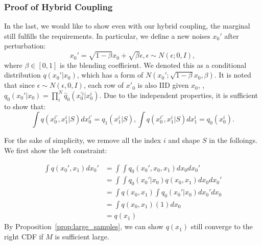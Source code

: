 \subsubsection{Proof of Hybrid Coupling}

In the last, we would like to show even with our hybrid coupling, the marginal still fulfills the requirements.
%
In particular, we define a new noises $x_0'$ after perturbation:
\begin{equation}
    x_0' = \sqrt{1 - \beta} x_0 + \sqrt{\beta} \epsilon, \epsilon \sim N(\epsilon; 0, I),
\end{equation}
where $\beta \in [0, 1]$ is the blending coefficient. We denoted this as a conditional distribution $q(x_0'| x_0)$, which has a form of $N(x_0'; \sqrt{1 - \beta}x_0, \beta)$.
%
It is noted that since $\epsilon \sim N(\epsilon, 0, I)$, each row of $x'_0$ is also IID given $x_0$, \ie, $q_0(x_0' | x_0) = \prod_i^N \hat{q}_0(x_0^{'i} | x_0^i)$.
%
Due to the independent properties, it is sufficient to show that:
\begin{equation}
    \int q(x_0^{i'}, x_1^i | S) dx_0^{i'} = q_1(x^i_1|S), 
    \int q(x_0^{i'}, x_1^i | S) dx_1^{i} = q_0(x_0^i).
\end{equation}

For the sake of simplicity, we remove all the index $i$ and shape $S$ in the folloings.
We first show the left constraint:
\iffalse
\begin{align}
    q(x_1) & = \int q(x_0', x_1) dx_0' = \int \int q_0(x_0) q(x_0'| x_0) q(x_1|x_0, x_0') dx_0 dx_0' \\
    & = \int \int q_0(x_0) q(x_0'| x_0) q(x_1|x_0) dx_0 dx_0' \\
    & =  \int \int  q_0(x_0) q(x_0'| x_0) q(x_1|x_0)  dx_0' dx_0 \\
    & = \int q_0(x_0) q(x_1|x_0) \int  q(x_0'| x_0)  dx_0' dx_0 \\
    & = \int q_0(x_0) q(x_1|x_0) (1) dx_0 \\
    & = \int q(x_0, x_1) dx_0  = \frac{1}{M} \\
\end{align}
\fi
\begin{align}
    \int q(x_0', x_1) dx_0' & = \int \int q_0(x_0', x_0, x_1) dx_0 dx_0' \\
    & = \int \int q_0(x_0'|x_0) q(x_0, x_1) dx_0 dx_0' \\
    & =  \int q(x_0, x_1) \int  q_0(x_0'|x_0)  dx_0' dx_0 \\
    & = \int q(x_0, x_1) (1) dx_0 \\
    & = q(x_1)
\end{align}
By Proposition~\ref{prop:large_samples}, we can show $q(x_1)$ still converge to the right CDF if $M$ is sufficient large.

